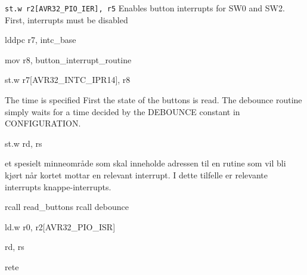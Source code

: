 \texttt{st.w r2[AVR32_PIO_IER], r5}
Enables button interrupts for SW0 and SW2.
First, interrupts must be disabled


lddpc r7, intc_base

mov r8, button_interrupt_routine

st.w r7[AVR32_INTC_IPR14], r8

The time is specified 
First the state of the buttons is read.
The debounce routine simply waits for a time decided by the DEBOUNCE constant in CONFIGURATION.

st.w rd, rs


et spesielt minneområde som skal inneholde adressen til en rutine som vil bli kjørt når kortet mottar en relevant interrupt. I dette tilfelle er relevante interrupts knappe-interrupts.

rcall read_buttons
rcall debounce

ld.w r0, r2[AVR32_PIO_ISR]

rd, rs

rete
